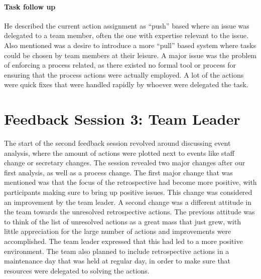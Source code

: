 \paragraph{Task follow up}
He described the current action assignment as ``push'' based where an issue was delegated to a team member, often the one with expertise relevant to the issue. Also mentioned was a desire to introduce a more ``pull'' based system where tasks could be chosen by team members at their leisure. A major issue was the problem of enforcing a process related, as there existed no formal tool or process for ensuring that the process actions were actually employed. A lot of the actions were quick fixes that were handled rapidly by whoever were delegated the task.
\clearpage

\section{Feedback Session 3: Team Leader}
\label{second-feedback-results}
The start of the second feedback session revolved around discussing event analysis, where the amount of actions were plotted next to events like staff change or secretary changes.  The session revealed two major changes after our first analysis, as well as a process change. The first major change that was mentioned was that the focus of the retrospective had become more positive, with participants making sure to bring up positive issues. This change was considered an improvement by the team leader. A second change was a different attitude in the team towards the unresolved retrospective actions.  The previous attitude was to think of the list of unresolved actions as a great mass that just grew, with little appreciation for the large number of actions and improvements were accomplished. The team leader expressed that this had led to a more positive environment. The team also planned to include retrospective actions in a maintenance day that was held at regular day, in order to make sure that resources were delegated to solving the actions. 

